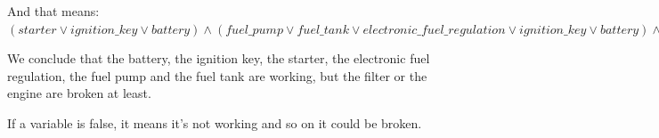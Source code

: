\documentclass[paper=a4, fontsize=11pt]{scrartcl} %
\numberwithin{equation}{section} %
\numberwithin{figure}{section} %
\numberwithin{table}{section} %
\begin{document}
\begin{itemize}
\begin{itemize}
		And that means: \\
		
$ ( starter \lor  ignition\_key \lor  battery) \land ( fuel\_pump \lor fuel\_tank \lor electronic\_fuel\_regulation \lor ignition\_key \lor battery) \land (\lnot engine \lor \lnot filter \lor \lnot fuel\_pump \lor \lnot fuel\_tank \lor \lnot electronic\_fuel\_regulation \lor \lnot ignition\_key \lor \lnot battery \lor \lnot starter \lor \lnot ignition\_key \lor \lnot battery) = 1 $
		
		
		We conclude that the battery, the ignition key, the starter, the electronic fuel regulation, the fuel pump and the fuel tank are working, but the filter or the engine are broken at least.
		
	\end{itemize}

\end{itemize}

If a variable is false, it means it's not working and so on it could be broken.




\end{document}
